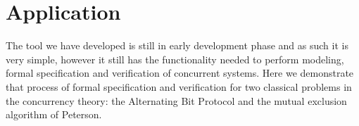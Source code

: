 \section{Application}

The tool we have developed is still in early development phase and as such it is very simple, however it still has the functionality needed to perform modeling, formal specification and verification of concurrent systems. Here we demonstrate that process of formal specification and verification for two classical problems in the concurrency theory: the Alternating Bit Protocol and the mutual exclusion algorithm of Peterson.


